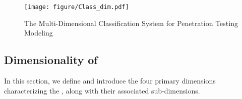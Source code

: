 \begin{figure*}[tb]
    \centering
    \texttt{[image: figure/Class\_dim.pdf]}
    \caption{The Multi-Dimensional
Classification System for Penetration Testing Modeling}
    \label{Class_dim}
\end{figure*}


\subsection{Dimensionality of~\modelcla}
In this section, we define and introduce the four primary dimensions characterizing the \modelcla, along with their associated sub-dimensions.





